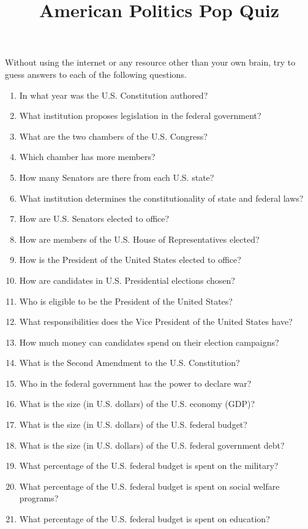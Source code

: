 \documentclass[a4, 12pt]{article}
\title{American Politics Pop Quiz}
\author{}
\date{}
\begin{document}
\maketitle
\nobibliography*

\noindent Without using the internet or any resource other than your own brain, try to guess answers to each of the following questions.

\begin{enumerate}
\item In what year was the U.S. Constitution authored?
\item What institution proposes legislation in the federal government?
\item What are the two chambers of the U.S. Congress?
\item Which chamber has more members?
\item How many Senators are there from each U.S. state?
\item What institution determines the constitutionality of state and federal laws?
\item How are U.S. Senators elected to office?
\item How are members of the U.S. House of Representatives elected?
\item How is the President of the United States elected to office?
\item How are candidates in U.S. Presidential elections chosen?
\item Who is eligible to be the President of the United States?
\item What responsibilities does the Vice President of the United States have?
\item How much money can candidates spend on their election campaigns?
\item What is the Second Amendment to the U.S. Constitution?
\item Who in the federal government has the power to declare war?
\item What is the size (in U.S. dollars) of the U.S. economy (GDP)?
\item What is the size (in U.S. dollars) of the U.S. federal budget?
\item What is the size (in U.S. dollars) of the U.S. federal government debt?
\item What percentage of the U.S. federal budget is spent on the military?
\item What percentage of the U.S. federal budget is spent on social welfare programs?
\item What percentage of the U.S. federal budget is spent on education?

\end{enumerate}
\end{document}
